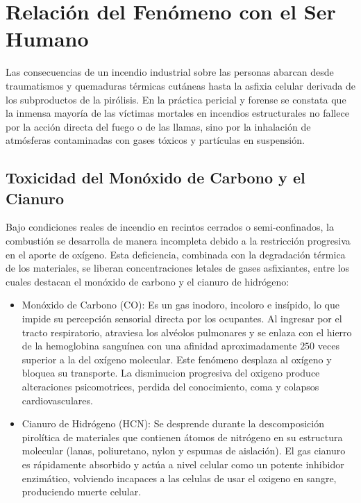 \chapter{Relación del Fenómeno con el Ser Humano}
\label{sec.cap3:ser_humano}

Las consecuencias de un incendio industrial sobre las personas abarcan desde traumatismos y quemaduras térmicas cutáneas
hasta la asfixia celular derivada de los subproductos de la pirólisis. En la práctica pericial y forense se constata que
la inmensa mayoría de las víctimas mortales en incendios estructurales no fallece por la acción directa del fuego o de
las llamas, sino por la inhalación de atmósferas contaminadas con gases tóxicos y partículas en suspensión.

\section{Toxicidad del Monóxido de Carbono y el Cianuro}

Bajo condiciones reales de incendio en recintos cerrados o semi-confinados, la combustión se desarrolla de manera
incompleta debido a la restricción progresiva en el aporte de oxígeno. Esta deficiencia, combinada con la degradación
térmica de los materiales, se liberan concentraciones letales de gases asfixiantes, entre los cuales destacan el
monóxido de carbono y el cianuro de hidrógeno:

\begin{itemize}
    \item Monóxido de Carbono (CO): Es un gas inodoro, incoloro e insípido, lo que impide su percepción sensorial directa
          por los ocupantes. Al ingresar por el tracto respiratorio, atraviesa los alvéolos pulmonares y se enlaza con el
          hierro de la hemoglobina sanguínea con una afinidad aproximadamente $250$ veces superior a la del oxígeno
          molecular. Este fenómeno desplaza al oxígeno y bloquea su transporte. La disminucion progresiva del oxigeno
          produce alteraciones psicomotrices, perdida del conocimiento, coma y colapsos cardiovasculares.
    \item Cianuro de Hidrógeno (HCN): Se desprende durante la descomposición pirolítica de materiales que contienen
          átomos de nitrógeno en su estructura molecular (lanas, poliuretano, nylon y espumas de aislación). El gas
          cianuro es rápidamente absorbido y actúa a nivel celular como un potente inhibidor enzimático, volviendo
          incapaces a las celulas de usar el oxigeno en sangre, produciendo muerte celular.
\end{itemize}

